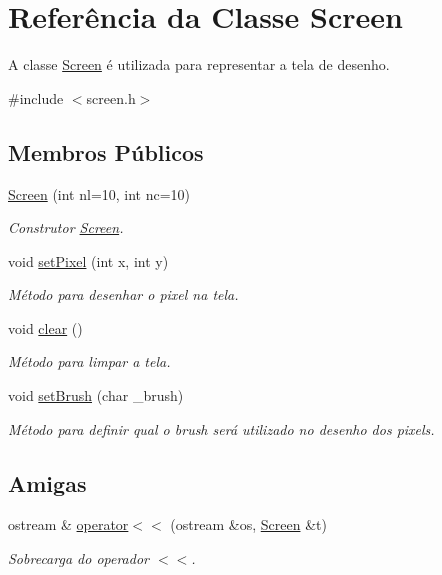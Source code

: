 \hypertarget{class_screen}{}\section{Referência da Classe Screen}
\label{class_screen}


A classe \mbox{\hyperlink{class_screen}{Screen}} é utilizada para representar a tela de desenho.  




{\ttfamily \#include $<$screen.\+h$>$}

\subsection*{Membros Públicos}
\begin{DoxyCompactItemize}
\item 
\mbox{\hyperlink{class_screen_a4f0097a240880bbf75242dd0938d7f38}{Screen}} (int nl=10, int nc=10)
\begin{DoxyCompactList}\small\item\em Construtor \mbox{\hyperlink{class_screen}{Screen}}. \end{DoxyCompactList}\item 
void \mbox{\hyperlink{class_screen_ae6bea81c57a22d226507c3c26fa95ee0}{set\+Pixel}} (int x, int y)
\begin{DoxyCompactList}\small\item\em Método para desenhar o pixel na tela. \end{DoxyCompactList}\item 
void \mbox{\hyperlink{class_screen_a35e74266b2a04e37b354ceff7a5f1031}{clear}} ()
\begin{DoxyCompactList}\small\item\em Método para limpar a tela. \end{DoxyCompactList}\item 
void \mbox{\hyperlink{class_screen_aebc4eb6cb5acf15a0f04c1494622ab23}{set\+Brush}} (char \+\_\+brush)
\begin{DoxyCompactList}\small\item\em Método para definir qual o brush será utilizado no desenho dos pixels. \end{DoxyCompactList}\end{DoxyCompactItemize}
\subsection*{Amigas}
\begin{DoxyCompactItemize}
\item 
ostream \& \mbox{\hyperlink{class_screen_aab6a2880746bfe1b7964817cc8f0989e}{operator$<$$<$}} (ostream \&os, \mbox{\hyperlink{class_screen}{Screen}} \&t)
\begin{DoxyCompactList}\small\item\em Sobrecarga do operador $<$$<$. \end{DoxyCompactList}\end{DoxyCompactItemize}


